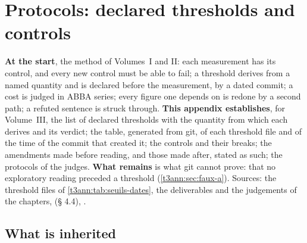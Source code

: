 
\chapter{Protocols: declared thresholds and controls}\label{t3ann:protocoles}

\begin{origine}
\textbf{At the start}, the method of Volumes~I and II: each measurement has its control, and every new control must be able to fail; a threshold derives from a named quantity and is declared before the measurement, by a dated commit; a cost is judged in ABBA series; every figure one depends on is redone by a second path; a refuted sentence is struck through.
\textbf{This appendix establishes}, for Volume~III, the list of declared thresholds with the quantity from which each derives and its verdict; the table, generated from git, of each threshold file and of the time of the commit that created it; the controls and their breaks; the amendments made before reading, and those made after, stated as such; the protocols of the judges.
\textbf{What remains} is what git cannot prove: that no exploratory reading preceded a threshold (\cref{t3ann:sec:faux-a}).
Sources: the threshold files of \cref{t3ann:tab:seuils-dates}, the deliverables and the judgements of the chapters,  (§ 4.4), .
\end{origine}

\section{What is inherited}\label{t3ann:sec:herite}

